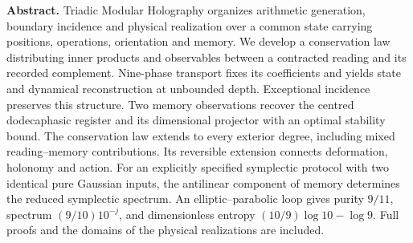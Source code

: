 \clearpage
\noindent\textbf{Abstract.}
Triadic Modular Holography organizes arithmetic generation, boundary incidence and physical realization over a common state carrying positions, operations, orientation and memory. We develop a conservation law distributing inner products and observables between a contracted reading and its recorded complement. Nine-phase transport fixes its coefficients and yields state and dynamical reconstruction at unbounded depth. Exceptional incidence preserves this structure. Two memory observations recover the centred dodecaphasic register and its dimensional projector with an optimal stability bound. The conservation law extends to every exterior degree, including mixed reading--memory contributions. Its reversible extension connects deformation, holonomy and action. For an explicitly specified symplectic protocol with two identical pure Gaussian inputs, the antilinear component of memory determines the reduced symplectic spectrum. An elliptic--parabolic loop gives purity \(9/11\), spectrum \((9/10)10^{-j}\), and dimensionless entropy \((10/9)\log10-\log9\). Full proofs and the domains of the physical realizations are included.
